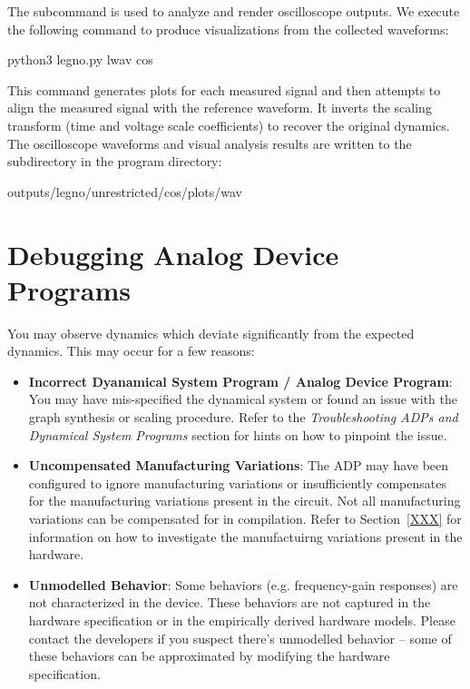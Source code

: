 The  subcommand is used to analyze and render oscilloscope outputs. We
execute the following command to produce visualizations from the collected waveforms: 

\begin{snippet}
python3 legno.py lwav cos
\end{snippet}

This command generates plots for each measured signal and then attempts to align
the measured signal with the reference waveform. It inverts the scaling
transform (time and voltage scale coefficients) to recover the original
dynamics. The oscilloscope waveforms and visual analysis results are written to the
 subdirectory in the program directory:

\begin{snippet}
  outputs/legno/unrestricted/cos/plots/wav
\end{snippet}


\section{Debugging Analog Device Programs}

You may observe dynamics which deviate significantly from the expected dynamics.
This may occur for a few reasons:

\begin{itemize}
\item\textbf{Incorrect Dyanamical System Program / Analog Device Program}: You
  may have mis-specified the dynamical system or found an issue with the graph
  synthesis or scaling procedure. Refer to the \textit{Troubleshooting ADPs and
    Dynamical System Programs} section for hints on how to pinpoint the issue. 

\item\textbf{Uncompensated Manufacturing Variations}: The ADP may have been
  configured to ignore manufacturing variations or insufficiently compensates
  for the manufacturing variations present in the circuit. Not all manufacturing
  variations can be compensated for in compilation. Refer to Section~\ref{XXX}
  for information on how to investigate the manufactuirng variations present in
  the hardware.

\item\textbf{Unmodelled Behavior}: Some behaviors (e.g. frequency-gain
  responses) are not characterized in the device. These behaviors are not
  captured in the hardware specification or in the empirically derived hardware
  models. Please contact the developers if you suspect there's unmodelled behavior
  -- some of these behaviors can be approximated by modifying the hardware
  specification.
\end{itemize}

